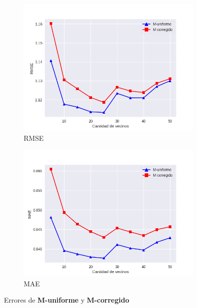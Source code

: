\documentclass[hidelinks,12pt,a4paper]{book}
\theoremstyle{plain}
\theoremstyle{definition}
\begin{document}
\begin{figure}[ht]
\centering
    \begin{subfigure}[b]{0.5\textwidth}               
		\centering
		\includegraphics[width=\textwidth]{graficos/cold-3-rmse.png}
		\caption{RMSE}\label{fig:cold3-rmse}
    \end{subfigure}%
    \begin{subfigure}[b]{0.5\textwidth}
	  \centering
		\includegraphics[width=\textwidth]{graficos/cold-3-mae.png}
		\caption{MAE}\label{fig:cold3}
    \end{subfigure}
    \caption{Errores de \textbf{M-uniforme} y \textbf{M-corregido}}\label{fig:cold4}
\end{figure}
\end{document}
